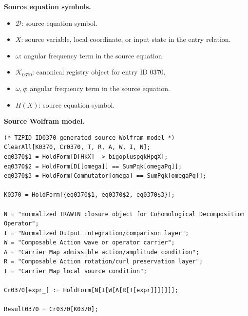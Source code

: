 \begin{minipage}[t]{0.49\linewidth}
\begingroup
\small
\raggedright
\textbf{Source equation symbols.}\par
\begin{itemize}[leftmargin=1.35em,itemsep=1pt,topsep=1pt,parsep=0pt]
    \item $\mathcal{D}$: source equation symbol.
    \item $X$: source variable, local coordinate, or input state in the entry relation.
    \item $\omega$: angular frequency term in the source equation.
    \item $\mathcal{K}_{0370}$: canonical registry object for entry ID 0370.
    \item $\omega,q$: angular frequency term in the source equation.
    \item $H(X)$: source equation symbol.
\end{itemize}
\endgroup
\end{minipage}\hfill
\begin{minipage}[t]{0.47\linewidth}
\begingroup
\scriptsize
\raggedright
\textbf{Source Wolfram model.}\par
\begin{Verbatim}[fontsize=\tiny,breaklines=true,breakanywhere=true]
(* TZPID ID0370 generated source Wolfram model *)
ClearAll[K0370, Cr0370, T, R, A, W, I, N];
eq0370$1 = HoldForm[D[HkX] -> bigopluspqkHpqX];
eq0370$2 = HoldForm[D[[omega]] == SumPqk[omegaPq]];
eq0370$3 = HoldForm[Commutator[omega] == SumPqk[omegaPq]];

K0370 = HoldForm[{eq0370$1, eq0370$2, eq0370$3}];

N = "normalized TRAWIN closure object for Cohomological Decomposition Operator";
I = "Normalized Output integration/comparison layer";
W = "Composable Action wave or operator carrier";
A = "Carrier Map admissible action/amplitude condition";
R = "Composable Action rotation/curl preservation layer";
T = "Carrier Map local source condition";

Cr0370[expr_] := HoldForm[N[I[W[A[R[T[expr]]]]]]];

Result0370 = Cr0370[K0370];
\end{Verbatim}
\endgroup
\end{minipage}


